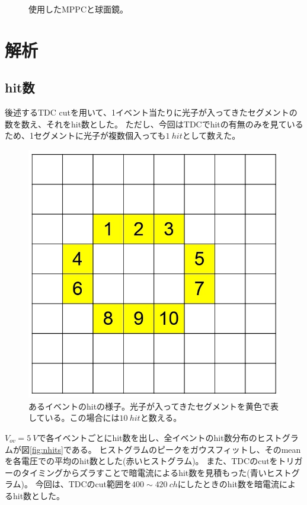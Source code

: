 \documentclass[uplatex, titlepage, dvipdfmx, 12pt, a4paper]{jsreport}
\begin{document}
\begin{figure}[htbp]
\begin{center}
\begin{tabular}{c}
    \end{tabular}
    \caption{使用したMPPCと球面鏡。}
    \label{fig:MPPC'N'mirror}
  \end{center}
\end{figure}


\chapter{解析}

\section{hit数}
後述するTDC cutを用いて、1イベント当たりに光子が入ってきたセグメントの数を数え、それをhit数とした。
ただし、今回はTDCでhitの有無のみを見ているため、1セグメントに光子が複数個入っても$\SI{1}{hit}$として数えた。
\begin{figure}[hbtp]
  \begin{center} 
    \includegraphics[scale=0.4, clip]{image/hit_image.jpg}
    \caption{あるイベントのhitの様子。光子が入ってきたセグメントを黄色で表している。この場合には$\SI{10}{hit}$と数える。} 
    \label{fig:hit_image} 
  \end{center}
\end{figure}

$V_{ov}=\SI{5}{V}$で各イベントごとにhit数を出し、全イベントのhit数分布のヒストグラムが図\ref{fig:nhits}である。
ヒストグラムのピークをガウスフィットし、そのmeanを各電圧での平均のhit数とした(赤いヒストグラム)。
また、TDCのcutをトリガーのタイミングからズラすことで暗電流によるhit数を見積もった(青いヒストグラム)。
今回は、TDCのcut範囲を$400\sim420\:\si{ch}$にしたときのhit数を暗電流によるhit数とした。
\end{document}
